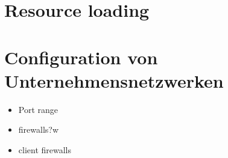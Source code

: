
\section{Resource loading}

\section{ Configuration von Unternehmensnetzwerken }

\begin{itemize}
	\item Port range
	\item firewalls?w
	\item client firewalls
\end{itemize}